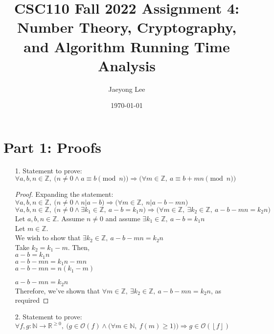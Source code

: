 \documentclass[11pt]{article}
\title{CSC110 Fall 2022 Assignment 4: Number Theory, Cryptography, and Algorithm Running Time Analysis}
\author{Jaeyong Lee}
\date{\today}
\newcommand{\floor}[1]{\left\lfloor #1 \right\rfloor}
\begin{document}
\maketitle


\section*{Part 1: Proofs}

\begin{enumerate}
\item[1.] Statement to prove:
$\forall a, b, n \in \mathbb{Z},~ \big(n \neq 0 \land a \equiv b \pmod n \big) \Rightarrow \big(\forall m \in \mathbb{Z},~ a \equiv b + mn \pmod n\big)$

\begin{proof}
Expanding the statement: \\

$\forall a, b, n \in \mathbb{Z},~ \big(n \neq 0 \land n|a - b \big) \Rightarrow \big(\forall m \in \mathbb{Z},~ n | a - b - mn\big)$ \\
$\forall a, b, n \in \mathbb{Z},~ \big(n \neq 0 \land \exists k_1 \in \mathbb{Z},~ a-b=k_1n \big) \Rightarrow \big(\forall m \in \mathbb{Z},~ \exists k_2 \in \mathbb{Z},~ a-b-mn=k_2n\big)$ \\

Let $a, b, n \in \mathbb{Z}$. Assume $n \neq 0$ and assume $\exists k_1 \in \mathbb{Z},~ a-b=k_1n$ \\

Let $m \in \mathbb{Z}$. \\
We wish to show that $\exists k_2 \in \mathbb{Z},~ a-b-mn=k_2n$ \\ 

Take $k_2 = k_1 - m$. Then,\\ 
$a-b=k_1n$ \\
$a - b - mn = k_1n - mn$ \\
$a-b-mn = n(k_1 - m)$

$a-b-mn = k_2n$\\

Therefore, we've shown that $\forall m \in \mathbb{Z},~ \exists k_2 \in \mathbb{Z},~ a-b-mn=k_2n$, as required 

\end{proof}

\newpage

\item[2.] Statement to prove:
$
\forall f, g: \mathbb{N} \to \mathbb{R}^{\geq 0},~
\Big(g \in \mathcal{O}(f) \land \big(\forall m \in \mathbb{N},~ f(m) \geq 1) \Big) \Rightarrow
g \in \mathcal{O}(\floor{f})
$


\end{enumerate}
\end{document}
